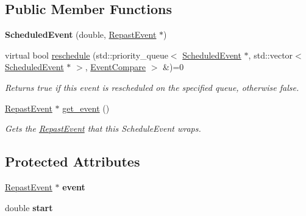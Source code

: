 \subsection*{Public Member Functions}
\begin{DoxyCompactItemize}
\item 
\hypertarget{classrepast_1_1_scheduled_event_ac2d5b9640a4b968cfc5f94d25ffa1995}{{\bfseries Scheduled\-Event} (double, \hyperlink{classrepast_1_1_repast_event}{Repast\-Event} $\ast$)}\label{classrepast_1_1_scheduled_event_ac2d5b9640a4b968cfc5f94d25ffa1995}

\item 
\hypertarget{classrepast_1_1_scheduled_event_a1fa06003d6e3aecce186ef6eb3e32c61}{virtual bool \hyperlink{classrepast_1_1_scheduled_event_a1fa06003d6e3aecce186ef6eb3e32c61}{reschedule} (std\-::priority\-\_\-queue$<$ \hyperlink{classrepast_1_1_scheduled_event}{Scheduled\-Event} $\ast$, std\-::vector$<$ \hyperlink{classrepast_1_1_scheduled_event}{Scheduled\-Event} $\ast$ $>$, \hyperlink{classrepast_1_1_event_compare}{Event\-Compare} $>$ \&)=0}\label{classrepast_1_1_scheduled_event_a1fa06003d6e3aecce186ef6eb3e32c61}

\begin{DoxyCompactList}\small\item\em Returns true if this event is rescheduled on the specified queue, otherwise false. \end{DoxyCompactList}\item 
\hypertarget{classrepast_1_1_scheduled_event_a937c8e3ec29d6e232201ce9aaffb1e2b}{\hyperlink{classrepast_1_1_repast_event}{Repast\-Event} $\ast$ \hyperlink{classrepast_1_1_scheduled_event_a937c8e3ec29d6e232201ce9aaffb1e2b}{get\-\_\-event} ()}\label{classrepast_1_1_scheduled_event_a937c8e3ec29d6e232201ce9aaffb1e2b}

\begin{DoxyCompactList}\small\item\em Gets the \hyperlink{classrepast_1_1_repast_event}{Repast\-Event} that this Schedule\-Event wraps. \end{DoxyCompactList}\end{DoxyCompactItemize}
\subsection*{Protected Attributes}
\begin{DoxyCompactItemize}
\item 
\hypertarget{classrepast_1_1_scheduled_event_afe1c28943ae16de4fe32ba177741ec70}{\hyperlink{classrepast_1_1_repast_event}{Repast\-Event} $\ast$ {\bfseries event}}\label{classrepast_1_1_scheduled_event_afe1c28943ae16de4fe32ba177741ec70}

\item 
\hypertarget{classrepast_1_1_scheduled_event_a0302155f37ab0345e18e247eb3d3ac16}{double {\bfseries start}}\label{classrepast_1_1_scheduled_event_a0302155f37ab0345e18e247eb3d3ac16}

\end{DoxyCompactItemize}
